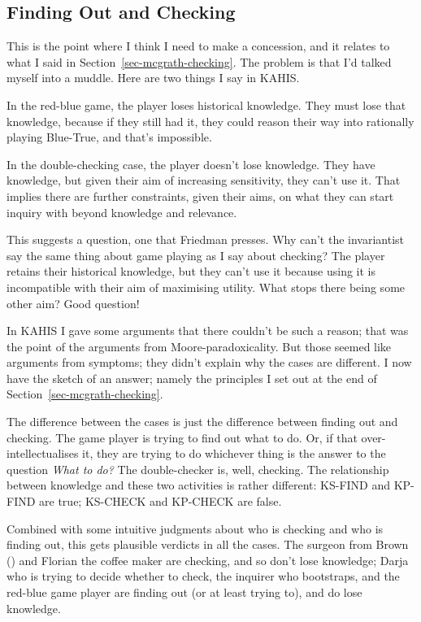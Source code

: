 \documentclass[
  11pt,
  letterpaper,
  DIV=11,
  numbers=noendperiod,
  twoside]{scrartcl}
\begin{document}
\subsection{Finding Out and Checking}\label{sec-friedman-checking}

This is the point where I think I need to make a concession, and it
relates to what I said in Section~\ref{sec-mcgrath-checking}. The
problem is that I'd talked myself into a muddle. Here are two things I
say in KAHIS.

In the red-blue game, the player loses historical knowledge. They must
lose that knowledge, because if they still had it, they could reason
their way into rationally playing Blue-True, and that's impossible.

In the double-checking case, the player doesn't lose knowledge. They
have knowledge, but given their aim of increasing sensitivity, they
can't use it. That implies there are further constraints, given their
aims, on what they can start inquiry with beyond knowledge and
relevance.

This suggests a question, one that Friedman presses. Why can't the
invariantist say the same thing about game playing as I say about
checking? The player retains their historical knowledge, but they can't
use it because using it is incompatible with their aim of maximising
utility. What stops there being some other aim? Good question!

In KAHIS I gave some arguments that there couldn't be such a reason;
that was the point of the arguments from Moore-paradoxicality. But those
seemed like arguments from symptoms; they didn't explain why the cases
are different. I now have the sketch of an answer; namely the principles
I set out at the end of Section~\ref{sec-mcgrath-checking}.

The difference between the cases is just the difference between finding
out and checking. The game player is trying to find out what to do. Or,
if that over-intellectualises it, they are trying to do whichever thing
is the answer to the question \emph{What to do?} The double-checker is,
well, checking. The relationship between knowledge and these two
activities is rather different: KS-FIND and KP-FIND are true; KS-CHECK
and KP-CHECK are false.

Combined with some intuitive judgments about who is checking and who is
finding out, this gets plausible verdicts in all the cases. The surgeon
from Brown () and Florian the coffee maker
are checking, and so don't lose knowledge; Darja who is trying to decide
whether to check, the inquirer who bootstraps, and the red-blue game
player are finding out (or at least trying to), and do lose knowledge.
\end{document}
